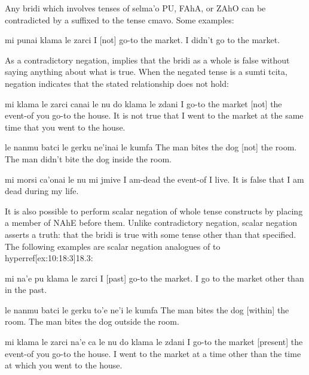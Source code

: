 Any bridi which involves tenses of selma'o PU, FAhA, or ZAhO
    can be contradicted by a  suffixed to the tense cmavo.
    Some examples:
\begin{example}
mi punai klama le zarci\n
I  [not] go-to the market.\n
I didn't go to the market.
\end{example}

As a contradictory negation, 
    implies that the bridi as a whole is false without saying
    anything about what is true. When the negated tense is a sumti
    tcita,  negation indicates that the stated relationship
    does not hold:
\begin{example}
mi klama le zarci canai le nu\n
\T	do klama le zdani\n
I go-to the market  [not] the event-of\n
\T	you go-to the house.\n
It is not true that I went to the market at the same\n
\T	time that you went to the house.
\end{example}

\begin{example}
le nanmu batci le gerku ne'inai le kumfa\n
The man bites the dog  [not] the room.\n
The man didn't bite the dog inside the room.
\end{example}

\begin{example}
mi morsi ca'onai le nu mi jmive\n
I am-dead  the event-of I live.\n
It is false that I am dead during my life.
\end{example}

It is also possible to perform scalar negation of whole tense
    constructs by placing a member of NAhE before them. Unlike
    contradictory negation, scalar negation asserts a truth: that
    the bridi is true with some tense other than that specified.
    The following examples are scalar negation analogues of  to hyperref[ex:10:18:3]{18.3}:
\begin{example}
mi na'e pu klama le zarci\n
I  [past] go-to the market.\n
I go to the market other than in the past.
\end{example}

\begin{example}
le nanmu batci le gerku to'e ne'i le kumfa\n
The man bites the dog  [within] the room.\n
The man bites the dog outside the room.
\end{example}

\begin{example}
mi klama le zarci na'e ca le nu\n
\T	do klama le zdani\n
I go-to the market  [present] the event-of\n
\T	you go-to the house.\n
I went to the market at a time other than the time at\n
\T	which you went to the house.
\end{example}


